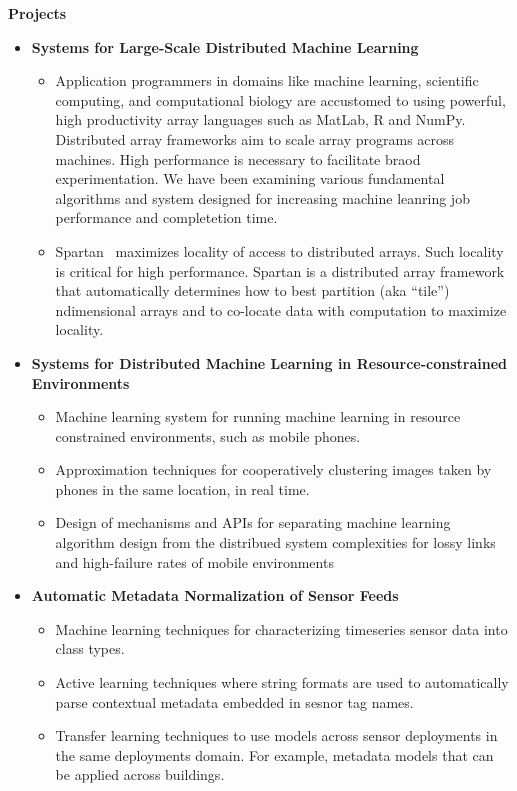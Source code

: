 \documentclass[letterpaper,11pt]{article}
\newcommand{\resitem}[1]{\item #1 \vspace{-2pt}}
\newcommand{\resheading}[1]{{\large \colorbox{mygrey}{\begin{minipage}{\textwidth}{\textbf{#1 \vphantom{p\^{E}}}}\end{minipage}}}}
\begin{document}
\resheading{Projects}
\begin{itemize}
    \item {\textbf{Systems for Large-Scale Distributed Machine Learning}}
            \begin{itemize}
                \resitem{Application programmers in domains like machine learning, scientific computing, and computational biology are accustomed to using powerful, high productivity array languages such as MatLab, R and NumPy. Distributed array frameworks aim to scale array programs across machines. High performance is necessary to facilitate braod experimentation.  We have been examining various fundamental algorithms and system designed for increasing machine leanring job performance and completetion time.}
                \resitem{Spartan~\cite{spartan} maximizes locality of access to distributed arrays. Such locality is critical for high performance.  Spartan is a distributed array framework that automatically determines how to best partition (aka “tile”) ndimensional arrays and to co-locate data with computation to maximize locality.}
            \end{itemize}

    \item {\textbf{Systems for Distributed Machine Learning in Resource-constrained Environments}}
        \begin{itemize}
            \resitem{Machine learning system for running machine learning in resource constrained environments, such as mobile phones.}
            \resitem{Approximation techniques for cooperatively clustering images taken by phones in the same location, in real time.}
            \resitem{Design of mechanisms and APIs for separating machine learning algorithm design from the distribued system complexities for lossy links and high-failure rates of mobile environments} 
        \end{itemize}

    \item {\textbf{Automatic Metadata Normalization of Sensor Feeds}}
        \begin{itemize}
            \resitem{Machine learning techniques for characterizing timeseries sensor data into class types.}
            \resitem{Active learning techniques where string formats are used to automatically parse contextual metadata embedded in sesnor tag names.\cite{Arka_buildsys2015}}
            \resitem{Transfer learning techniques to use models across sensor deployments in the same deployments domain.  For example, metadata models that can be applied across buildings.~\cite{Fontugne:2013:SBS:2461381.2461399,Hong:2013:TAS:2528282.2528302,Dezhi_buildsys2015}}
        \end{itemize}
\end{itemize}
\end{document}
